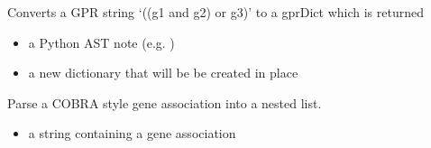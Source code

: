 \documentclass[letterpaper,10pt,english]{sphinxmanual}
\begin{document}

\begin{fulllineitems}
\label{\detokenize{modules_doc:cbmpy.CBCommon.getGPRasDictFromString}}
\pysigstartsignatures
{}
\pysigstopsignatures
\sphinxAtStartPar
Converts a GPR string ‘((g1 and g2) or g3)’ to a gprDict which is returned
\begin{itemize}
\item {} 
\sphinxAtStartPar
{} a Python AST note (e.g. )

\item {} 
\sphinxAtStartPar
{} a new dictionary that will be be created in place

\end{itemize}

\end{fulllineitems}


\begin{fulllineitems}
\label{\detokenize{modules_doc:cbmpy.CBCommon.parseGeneAssociation}}
\pysigstartsignatures
{}
\pysigstopsignatures
\sphinxAtStartPar
Parse a COBRA style gene association into a nested list.
\begin{itemize}
\item {} 
\sphinxAtStartPar
{} a string containing a gene association

\end{itemize}

\end{fulllineitems}

\end{document}
